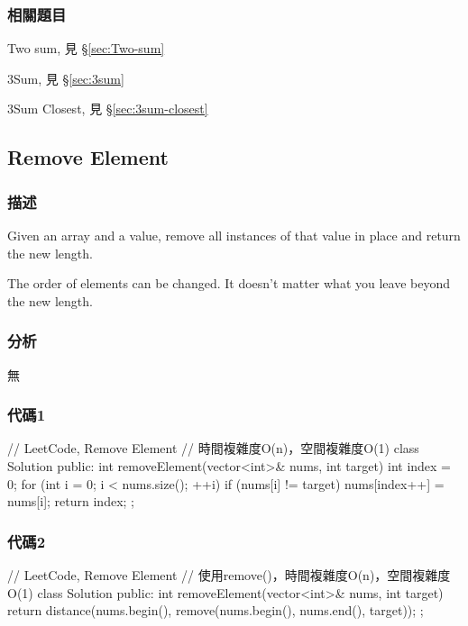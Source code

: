\subsubsection{相關題目}
\begindot
\item Two sum, 見 \S \ref{sec:Two-sum}
\item 3Sum, 見 \S \ref{sec:3sum}
\item 3Sum Closest, 見 \S \ref{sec:3sum-closest}
\myenddot


\subsection{Remove Element} %
\label{sec:remove-element }


\subsubsection{描述}
Given an array and a value, remove all instances of that value in place and return the new length.

The order of elements can be changed. It doesn't matter what you leave beyond the new length.


\subsubsection{分析}
無


\subsubsection{代碼1}
\begin{Code}
// LeetCode, Remove Element
// 時間複雜度O(n)，空間複雜度O(1)
class Solution {
public:
    int removeElement(vector<int>& nums, int target) {
        int index = 0;
        for (int i = 0; i < nums.size(); ++i) {
            if (nums[i] != target) {
                nums[index++] = nums[i];
            }
        }
        return index;
    }
};
\end{Code}


\subsubsection{代碼2}
\begin{Code}
// LeetCode, Remove Element
// 使用remove()，時間複雜度O(n)，空間複雜度O(1)
class Solution {
public:
    int removeElement(vector<int>& nums, int target) {
        return distance(nums.begin(), remove(nums.begin(), nums.end(), target));
    }
};
\end{Code}


